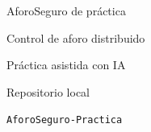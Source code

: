 \documentclass[12pt,a4paper]{article}
\begin{document}
\begin{center}
\vspace*{4cm}
{\LARGE AforoSeguro de práctica\par}
\bigskip
{\large Control de aforo distribuido\par}
\bigskip
Práctica asistida con IA\par
\bigskip
Repositorio local\par
\texttt{AforoSeguro-Practica}\par
\end{center}
\end{document}
